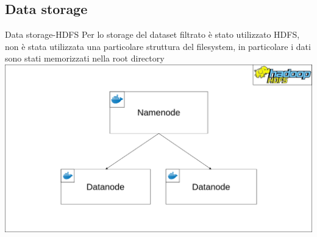 \documentclass[13pt,aspectratio=169,t,xcolor=table]{beamer}
\begin{document}
\subsection{Data storage}
\begin{frame}{Data storage-HDFS}
    Per lo storage del dataset filtrato è stato utilizzato HDFS, non è stata utilizzata una particolare struttura del filesystem, in particolare i dati sono stati memorizzati nella root directory
    \begin{adjustbox}{margin=0cm 0cm 0cm 0.8cm, center} %
        \includegraphics[width=.6\textwidth]{res/hdfs_cluster.png}
    \end{adjustbox}
\end{frame}
\end{document}
